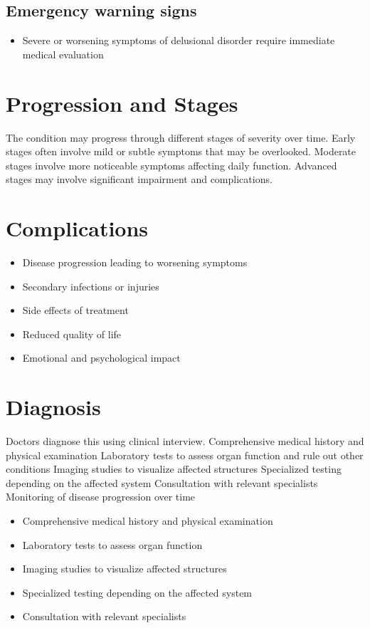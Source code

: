 \subsection{Emergency warning signs}
\begin{itemize}[noitemsep]
  \item Severe or worsening symptoms of delusional disorder require immediate medical evaluation
\end{itemize}
\section{Progression and Stages}
The condition may progress through different stages of severity over time. Early stages often involve mild or subtle symptoms that may be overlooked. Moderate stages involve more noticeable symptoms affecting daily function. Advanced stages may involve significant impairment and complications.
\section{Complications}
\begin{itemize}[noitemsep]
  \item Disease progression leading to worsening symptoms
  \item Secondary infections or injuries
  \item Side effects of treatment
  \item Reduced quality of life
  \item Emotional and psychological impact
\end{itemize}
\section{Diagnosis}
Doctors diagnose this using clinical interview. Comprehensive medical history and physical examination Laboratory tests to assess organ function and rule out other conditions Imaging studies to visualize affected structures Specialized testing depending on the affected system Consultation with relevant specialists Monitoring of disease progression over time

\begin{itemize}[noitemsep]
  \item Comprehensive medical history and physical examination
  \item Laboratory tests to assess organ function
  \item Imaging studies to visualize affected structures
  \item Specialized testing depending on the affected system
  \item Consultation with relevant specialists
\end{itemize}

